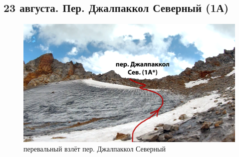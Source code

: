 \subsection{23 августа.  Пер. Джалпаккол Северный (1А)}

\begin{figure}[h]
	\centering
	\includegraphics[width=0.7\linewidth]{../pics/dzh_1}
	\caption{перевальный взлёт пер. Джалпаккол Северный}
	\label{fig:dzh_1}
\end{figure}


\newpage